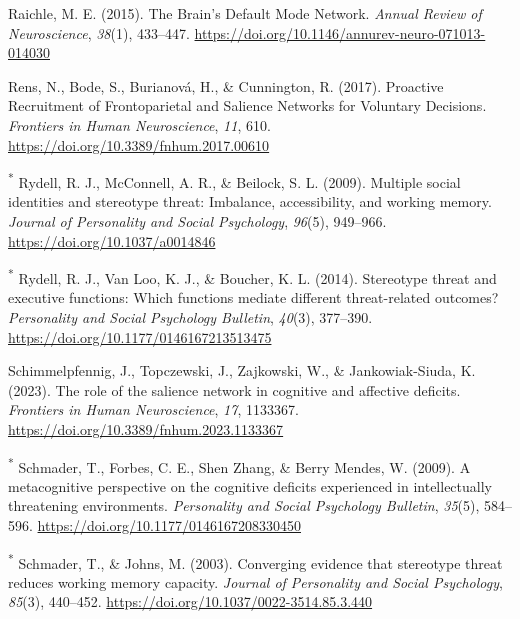\documentclass[
  stu, a4paper,floatsintext]{apa7}
\newlength{\cslhangindent}
\newenvironment{CSLReferences}[2] %
 {\begin{list}{}{%
  \setlength{\itemindent}{0pt}
  \setlength{\leftmargin}{0pt}
  \setlength{\parsep}{0pt}
  \ifodd #1
   \setlength{\leftmargin}{\cslhangindent}
   \setlength{\itemindent}{-1\cslhangindent}
  \fi
  \setlength{\itemsep}{#2\baselineskip}}}
 {\end{list}}
\begin{document}
\begin{CSLReferences}{1}{0}
Raichle, M. E. (2015). The {Brain}'s {Default Mode Network}. \emph{Annual Review of Neuroscience}, \emph{38}(1), 433--447. \url{https://doi.org/10.1146/annurev-neuro-071013-014030}

Rens, N., Bode, S., Burianová, H., \& Cunnington, R. (2017). Proactive {Recruitment} of {Frontoparietal} and {Salience Networks} for {Voluntary Decisions}. \emph{Frontiers in Human Neuroscience}, \emph{11}, 610. \url{https://doi.org/10.3389/fnhum.2017.00610}

\textsuperscript{*} Rydell, R. J., McConnell, A. R., \& Beilock, S. L. (2009). Multiple social identities and stereotype threat: {Imbalance}, accessibility, and working memory. \emph{Journal of Personality and Social Psychology}, \emph{96}(5), 949--966. \url{https://doi.org/10.1037/a0014846}

\textsuperscript{*} Rydell, R. J., Van Loo, K. J., \& Boucher, K. L. (2014). Stereotype threat and executive functions: {Which} functions mediate different threat-related outcomes? \emph{Personality and Social Psychology Bulletin}, \emph{40}(3), 377--390. \url{https://doi.org/10.1177/0146167213513475}

Schimmelpfennig, J., Topczewski, J., Zajkowski, W., \& Jankowiak-Siuda, K. (2023). The role of the salience network in cognitive and affective deficits. \emph{Frontiers in Human Neuroscience}, \emph{17}, 1133367. \url{https://doi.org/10.3389/fnhum.2023.1133367}

\textsuperscript{*} Schmader, T., Forbes, C. E., Shen Zhang, \& Berry Mendes, W. (2009). A metacognitive perspective on the cognitive deficits experienced in intellectually threatening environments. \emph{Personality and Social Psychology Bulletin}, \emph{35}(5), 584--596. \url{https://doi.org/10.1177/0146167208330450}

\textsuperscript{*} Schmader, T., \& Johns, M. (2003). Converging evidence that stereotype threat reduces working memory capacity. \emph{Journal of Personality and Social Psychology}, \emph{85}(3), 440--452. \url{https://doi.org/10.1037/0022-3514.85.3.440}


\end{CSLReferences}
\end{document}
